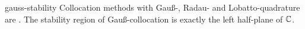 \begin{Theorem}{gauss-stability}
  Collocation methods with Gauß-, Radau- and Lobatto-quadrature are
  . The stability region of Gauß-collocation is
  exactly the left half-plane of $\mathbb C$.
\end{Theorem}

